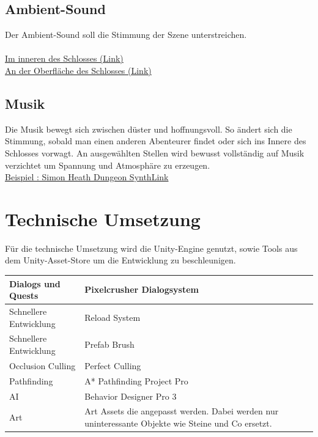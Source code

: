 \documentclass[envcountsame,envcountchap deutsch]{i-studis}
\begin{document}
	\section{Ambient-Sound}
	Der Ambient-Sound soll die Stimmung der Szene unterstreichen.\\
	\\
	\href{https://www.youtube.com/watch?v=_IWZyPWsSvQ}{Im inneren des Schlosses (Link)}
	\\
	\href{https://www.youtube.com/watch?v=xNN7iTA57jM}{An der Oberfläche des Schlosses (Link)}
	
	\section{Musik}
	Die Musik bewegt sich zwischen düster und hoffnungsvoll. So ändert sich die Stimmung, sobald man einen
	anderen Abenteurer findet oder sich ins Innere des Schlosses vorwagt. An ausgewählten Stellen wird
	bewusst vollständig auf Musik verzichtet um Spannung und Atmosphäre zu erzeugen.
	\\
	\href{ https://youtu.be/pn6-2hrTfjk?si=z8jH8ErvW_UlgCwL&t=1223}{Beispiel : Simon Heath Dungeon SynthLink}
	
\chapter{Technische Umsetzung}
Für die technische Umsetzung wird die Unity-Engine genutzt, sowie Tools aus dem Unity-Asset-Store um
die Entwicklung zu beschleunigen.

\begin{table}[ht]
	\centering
	\begin{tabular}{|l|p{9cm}|}
		\hline
		Dialogs und Quests & Pixelcrusher Dialogsystem \\ \hline
		
		Schnellere Entwicklung & Reload System \\ \hline
		
	Schnellere Entwicklung  & Prefab Brush
	 \\ \hline
		
		Occlusion Culling  &Perfect Culling \\ \hline
		
	Pathfinding & A* Pathfinding Project Pro \\ \hline
		
	AI  & Behavior Designer Pro 3 \\ \hline
		Art   &Art Assets die angepasst werden. Dabei werden
		nur uninteressante Objekte wie Steine und Co
		ersetzt. \\ \hline
	\end{tabular}
\end{table}
\end{document}
